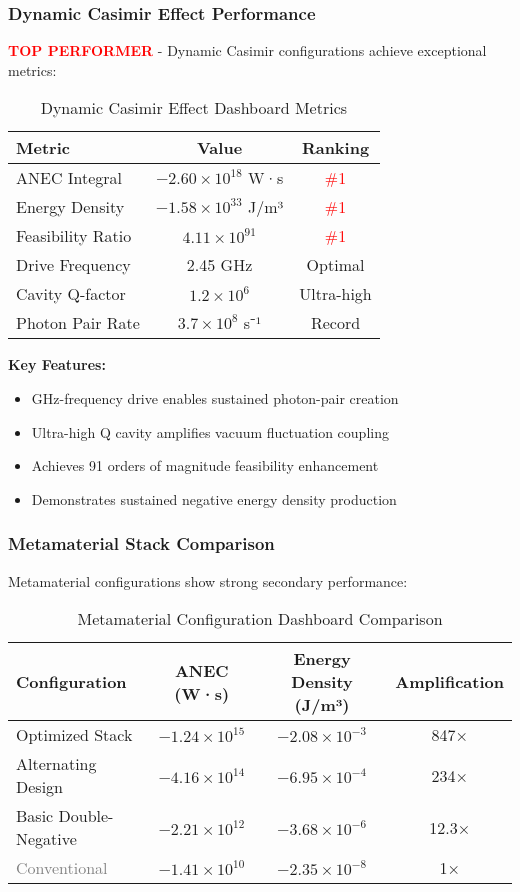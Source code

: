 \documentclass[11pt]{article}
\begin{document}
\subsubsection*{Dynamic Casimir Effect Performance}
\textcolor{red}{\textbf{TOP PERFORMER}} - Dynamic Casimir configurations achieve exceptional metrics:

\begin{table}[h]
\centering
\caption{Dynamic Casimir Effect Dashboard Metrics}
\begin{tabular}{lcc}
\toprule
\textbf{Metric} & \textbf{Value} & \textbf{Ranking} \\
\midrule
ANEC Integral & $-2.60 \times 10^{18}$ W·s & \textcolor{red}{\#1} \\
Energy Density & $-1.58 \times 10^{33}$ J/m³ & \textcolor{red}{\#1} \\
Feasibility Ratio & $4.11 \times 10^{91}$ & \textcolor{red}{\#1} \\
Drive Frequency & 2.45 GHz & Optimal \\
Cavity Q-factor & $1.2 \times 10^6$ & Ultra-high \\
Photon Pair Rate & $3.7 \times 10^8$ s⁻¹ & Record \\
\bottomrule
\end{tabular}
\end{table}

\textbf{Key Features:}
\begin{itemize}
  \item GHz-frequency drive enables sustained photon-pair creation
  \item Ultra-high Q cavity amplifies vacuum fluctuation coupling
  \item Achieves 91 orders of magnitude feasibility enhancement
  \item Demonstrates sustained negative energy density production
\end{itemize}

\subsubsection*{Metamaterial Stack Comparison}
Metamaterial configurations show strong secondary performance:

\begin{table}[h]
\centering
\caption{Metamaterial Configuration Dashboard Comparison}
\begin{tabular}{lccc}
\toprule
\textbf{Configuration} & \textbf{ANEC (W·s)} & \textbf{Energy Density (J/m³)} & \textbf{Amplification} \\
\midrule
Optimized Stack & $-1.24 \times 10^{15}$ & $-2.08 \times 10^{-3}$ & 847× \\
Alternating Design & $-4.16 \times 10^{14}$ & $-6.95 \times 10^{-4}$ & 234× \\
Basic Double-Negative & $-2.21 \times 10^{12}$ & $-3.68 \times 10^{-6}$ & 12.3× \\
\textcolor{gray}{Conventional} & $-1.41 \times 10^{10}$ & $-2.35 \times 10^{-8}$ & 1× \\
\bottomrule
\end{tabular}
\end{table}
\end{document}
